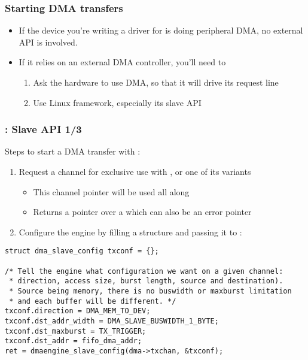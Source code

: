 \begin{frame}
  \frametitle{Starting DMA transfers}
  \begin{itemize}
  \item If the device you're writing a driver for is doing peripheral
    DMA, no external API is involved.
  \item If it relies on an external DMA controller, you'll need to
    \begin{enumerate}
    \item Ask the hardware to use DMA, so that it will drive its
      request line
    \item Use Linux  framework, especially its slave API
    \end{enumerate}
  \end{itemize}
\end{frame}

\begin{frame}[fragile]
  \frametitle{: Slave API 1/3}
  Steps to start a DMA transfer with :
  \begin{enumerate}
  \item Request a channel for exclusive use with
    , or one of its variants
    \begin{itemize}
    \item This channel pointer will be used all along
    \item Returns a pointer over a  which can also
      be an error pointer
    \end{itemize}
  \item Configure the engine by filling a 
    structure and passing it to :
  \end{enumerate}
\begin{verbatim}
struct dma_slave_config txconf = {};

/* Tell the engine what configuration we want on a given channel:
 * direction, access size, burst length, source and destination).
 * Source being memory, there is no buswidth or maxburst limitation
 * and each buffer will be different. */
txconf.direction = DMA_MEM_TO_DEV;
txconf.dst_addr_width = DMA_SLAVE_BUSWIDTH_1_BYTE;
txconf.dst_maxburst = TX_TRIGGER;
txconf.dst_addr = fifo_dma_addr;
ret = dmaengine_slave_config(dma->txchan, &txconf);
\end{verbatim}
\end{frame}

